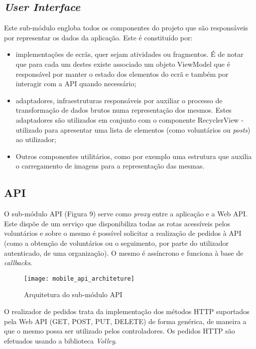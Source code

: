 \subsection{\textit{User Interface}}

Este sub-módulo engloba todos os componentes do projeto que são responsáveis por representar os dados da aplicação. Este é constituído por:

\begin{itemize}
	\item implementações de ecrãs, quer sejam atividades ou fragmentos. É de notar que para cada um destes existe associado um objeto ViewModel que é responsável por manter o estado dos elementos do ecrã e também por interagir com a API quando necessário; 
	\item adaptadores, infraestruturas responsáveis por auxiliar o processo de transformação de dados brutos numa representação dos mesmos. Estes adaptadores são utilizados em conjunto com o componente RecyclerView - utilizado para apresentar uma lista de elementos (como voluntários ou \textit{posts}) ao utilizador;
	\item Outros componentes utilitários, como por exemplo uma estrutura que auxilia o carregamento de imagens para a representação das mesmas.
\end{itemize} 

\subsection{API}

O sub-módulo API (Figura 9) serve como \textit{proxy} entre a aplicação e a Web API. Este dispõe de um serviço que disponibiliza todas as rotas acessíveis pelos voluntários e sobre o mesmo é possível solicitar a realização de pedidos à API (como a obtenção de voluntários ou o seguimento, por parte do utilizador autenticado, de uma organização). O mesmo é assíncrono e funciona à base de \textit{callbacks}.

\begin{figure}[h]
	\centering
	\texttt{[image: mobile\_api\_architeture]}
	\caption{Arquitetura do sub-módulo API}
\end{figure}

O realizador de pedidos trata da implementação dos métodos HTTP suportados pela Web API (GET, POST, PUT, DELETE) de forma genérica, de maneira a que o mesmo possa ser utilizado pelos controladores. Os pedidos HTTP são efetuados usando a biblioteca \textit{Volley}.

